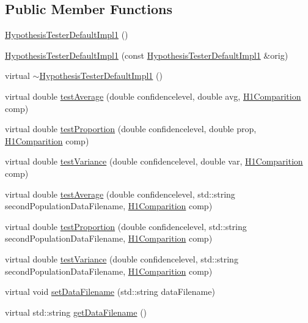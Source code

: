\subsection*{Public Member Functions}
\begin{DoxyCompactItemize}
\item 
\hyperlink{class_hypothesis_tester_default_impl1_ae2ab531222c97f2560ca9906c884ec16}{Hypothesis\+Tester\+Default\+Impl1} ()
\item 
\hyperlink{class_hypothesis_tester_default_impl1_a7ce6b4efe12965b52c3beaf449e3f2c8}{Hypothesis\+Tester\+Default\+Impl1} (const \hyperlink{class_hypothesis_tester_default_impl1}{Hypothesis\+Tester\+Default\+Impl1} \&orig)
\item 
virtual \hyperlink{class_hypothesis_tester_default_impl1_afede2d674ccab1a8fb70a4c6a256cf59}{$\sim$\+Hypothesis\+Tester\+Default\+Impl1} ()
\item 
virtual double \hyperlink{class_hypothesis_tester_default_impl1_a8aa938ff096e2d6d074943c8da0c089f}{test\+Average} (double confidencelevel, double avg, \hyperlink{class_hypothesis_tester__if_a89153ff990252f9f79856a2f2532c349}{H1\+Comparition} comp)
\item 
virtual double \hyperlink{class_hypothesis_tester_default_impl1_a2ad28fc4febe408ca28ef833943d32d4}{test\+Proportion} (double confidencelevel, double prop, \hyperlink{class_hypothesis_tester__if_a89153ff990252f9f79856a2f2532c349}{H1\+Comparition} comp)
\item 
virtual double \hyperlink{class_hypothesis_tester_default_impl1_a352ad4a1720f6cf6eb1d8c91c69097ba}{test\+Variance} (double confidencelevel, double var, \hyperlink{class_hypothesis_tester__if_a89153ff990252f9f79856a2f2532c349}{H1\+Comparition} comp)
\item 
virtual double \hyperlink{class_hypothesis_tester_default_impl1_ae0392a43fd1f7866b8f7dba9300c42a2}{test\+Average} (double confidencelevel, std\+::string second\+Population\+Data\+Filename, \hyperlink{class_hypothesis_tester__if_a89153ff990252f9f79856a2f2532c349}{H1\+Comparition} comp)
\item 
virtual double \hyperlink{class_hypothesis_tester_default_impl1_a460796157e7254ce5d8256874cfbbf68}{test\+Proportion} (double confidencelevel, std\+::string second\+Population\+Data\+Filename, \hyperlink{class_hypothesis_tester__if_a89153ff990252f9f79856a2f2532c349}{H1\+Comparition} comp)
\item 
virtual double \hyperlink{class_hypothesis_tester_default_impl1_a237116a13dea61dcbd2e38af41000a77}{test\+Variance} (double confidencelevel, std\+::string second\+Population\+Data\+Filename, \hyperlink{class_hypothesis_tester__if_a89153ff990252f9f79856a2f2532c349}{H1\+Comparition} comp)
\item 
virtual void \hyperlink{class_hypothesis_tester_default_impl1_afe67c9ad163cc19cdaf31acef8488dcf}{set\+Data\+Filename} (std\+::string data\+Filename)
\item 
virtual std\+::string \hyperlink{class_hypothesis_tester_default_impl1_ac306507c0d6890f7e59a29886c6fd869}{get\+Data\+Filename} ()
\end{DoxyCompactItemize}
